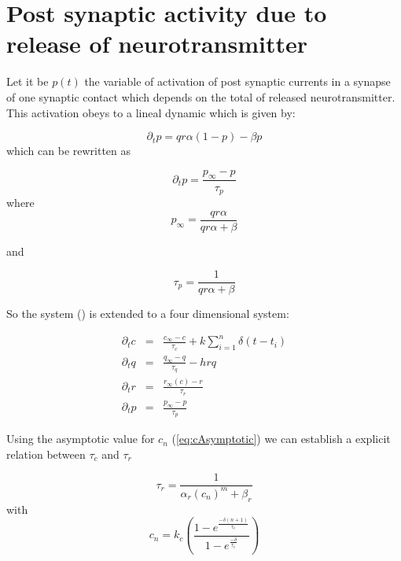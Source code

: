 \section{Post synaptic activity due to release of neurotransmitter }

Let it be $p(t)$ the variable of activation of post synaptic currents in a synapse of one synaptic contact which depends on the total of released neurotransmitter. This activation obeys to a lineal dynamic which is given by:

\begin{equation}
\partial_tp = qr\alpha(1-p)-\beta p    
\end{equation}
which can be rewritten as

\begin{equation}
    \partial_tp = \frac{p_{\infty}-p}{\tau_p}
\end{equation}
where 
\begin{equation}
    p_{\infty} = \frac{qr\alpha}{qr\alpha+\beta} 
\end{equation}

and 

\begin{equation}
    \tau_p = \frac{1}{qr\alpha + \beta}
\end{equation}

So the system () is extended to a four dimensional system:

\begin{eqnarray} 
\label{eq : deltap}
\partial_t c &=& \frac{c_{\infty}-c}{\tau_c} + k \sum_{i=1}^n \delta(t-t_i) \\
\partial_t q &=&  \frac{q_{\infty}-q}{\tau_q} - h r q \\
\partial_t r &=& \frac{r_{\infty}(c) - r}{\tau_r}  
\\
\partial_tp &=& \frac{p_{\infty}-p}{\tau_p}
\label{eq : deltapp}
\end{eqnarray}

Using the asymptotic value for $c_n$ (\ref{eq:cAsymptotic}) we can establish a explicit relation between $\tau_c$ and $\tau_r$

\begin{equation}
    \tau_r = \frac{1}{\alpha_r (c_n)^m + \beta_r}
\end{equation} with
\begin{equation}
    c_n = k_c \left(  \frac{1-e^{\frac{-\delta(n+1)}{\tau_c}}}{1-e^{\frac{-\delta}{\tau_c}}}\right)
\end{equation}

